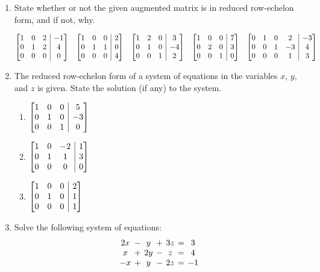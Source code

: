 \documentclass[12pt]{article}
\makeatletter
\newenvironment{amatrix}[1]{%
  \left[\begin{array}{@{}*{#1}{c}|c@{}}
}{%
  \end{array}\right]
}
\newcommand{\bam}{\begin{amatrix}}
\newcommand{\eam}{\end{amatrix}}
\makeatother
\begin{document}
\begin{enumerate}
\item State whether or not the given augmented matrix is in reduced row-echelon form, and if not, why.

\[
 \bam{3}1&0&2&-1\\0&1&2&4\\0&0&0&0\eam \quad \bam{3}1&0&0&2\\0&1&1&0\\0&0&0&4\eam \quad \bam{3}1&2&0&3\\0&1&0&-4\\0&0&1&2\eam \quad \bam{3}1&0&0&7\\0&2&0&3\\0&0&1&0\eam 
\quad \bam{4}0&1&0&2&-3\\0&0&1&-3&4\\0&0&0&1&3\eam
\]

\pagebreak

\item The reduced row-echelon form of a system of equations in the variables $x$, $y$, and $z$ is given. State the solution (if any) to the system.
\begin{enumerate}
 \item $\bam{3}1&0&0&5\\0&1&0&-3\\0&0&1&0\eam$

\bigskip

 \item $\bam{3}1&0&-2&1\\0&1&1&3\\0&0&0&0\eam$

\bigskip

 \item $\bam{3}1&0&0&2\\0&1&0&1\\0&0&0&1\eam$

\end{enumerate}

\bigskip

\item Solve the following system of equations:
\[
 \arraycolsep=2pt \begin{array}{ccccccc}
                   2x&-&y&+&3z&=&3\\x&+&2y&-&z&=&4\\-x&+&y&-&2z&=&-1
                  \end{array}
\]

 \end{enumerate}
\end{document}
